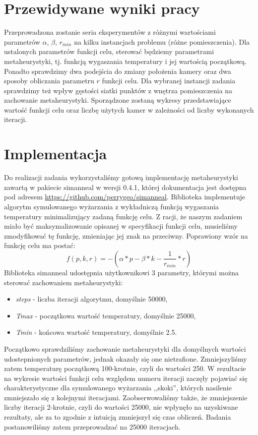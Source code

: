 \documentclass[12pt,a4paper]{article}
\begin{document}
\section{Przewidywane wyniki pracy}
Przeprowadzona zostanie seria eksperymentów z różnymi wartościami parametrów $\alpha$, $\beta$, $r_{min}$ na kilku instancjach problemu (różne pomieszczenia). Dla ustalonych parametrów funkcji celu, sterować będziemy parametrami metaheurystyki, tj. funkcją wygaszania temperatury i jej
wartością początkową. Ponadto sprawdzimy dwa podejścia do zmiany położenia kamery oraz dwa sposoby obliczania parametru $r$ funkcji celu. Dla wybranej
instancji zadania sprawdzimy też wpływ gęstości siatki punktów z wnętrza
pomieszczenia na zachowanie metaheurystyki. Sporządzone zostaną wykresy przedstawiające wartość funkcji celu oraz liczbę użytych kamer w zależności od liczby wykonanych iteracji. 

\section{Implementacja}
Do realizacji zadania wykorzystaliśmy gotową implementację metaheurystyki zawartą w pakiecie simanneal w wersji 0.4.1,
której dokumentacja jest dostępna pod adresem \url{https://github.com/perrygeo/simanneal}.
Biblioteka implementuje algorytm symulowanego wyżarzania z wykładniczą funkcją wygaszania temperatury minimalizujący zadaną
funkcję celu. Z racji, że naszym zadaniem miało być maksymalizowanie opisanej w specyfikacji funkcji celu, musieliśmy zmodyfikować tę
funkcję, zmieniając jej znak na przeciwny. Poprawiony wzór na funkcję celu ma postać:
$$f(p, k, r) = - (\alpha * p - \beta * k - \frac{1}{r_{min}} * r) $$ 
Biblioteka simanneal udostępnia użytkownikowi 3 parametry, którymi można sterować zachowaniem metaheurystyki:
\begin{itemize}
\item \emph{steps} - liczba iteracji algorytmu, domyślnie 50000,
\item \emph{Tmax} - początkowa wartość temperatury, domyślnie 25000,
\item \emph{Tmin} - końcowa wartość temperatury, domyślnie 2.5.
\end{itemize}
Początkowo sprawdziliśmy zachowanie metaheurystyki dla domyślnych wartości udostepnionych parametrów, jednak
okazały się one nietrafione. 
Zmniejszyliśmy zatem temperaturę początkową 100-krotnie, czyli do wartości 250. 
W rezultacie na wykresie wartości funkcji celu względem numeru iteracji zaczęły pojawiać się charakterystyczne 
dla symulowanego wyżarzania ,,skoki'', których nasilenie zmniejszało się z kolejnymi iteracjami. 
Zaobserwowaliśmy także, że zmniejszenie liczby iteracji 2-krotnie, czyli do wartości 25000, 
nie wpłynęło na uzyskiwane rezultaty, ale za to zgodnie z intuicją zmniejszył się czas obliczeń. 
Badania postanowiliśmy zatem przeprowadzać na 25000 iteracjach.
\end{document}

